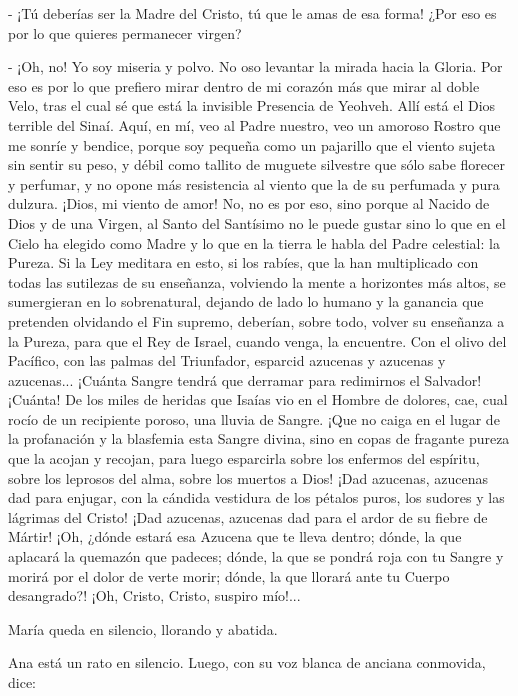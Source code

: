 \documentclass[12pt]{book} %
\begin{document}
- ¡Tú deberías ser la Madre del Cristo, tú que le amas de esa forma! ¿Por eso es por lo que quieres permanecer virgen? 

- ¡Oh, no! Yo soy miseria y polvo. No oso levantar la mirada hacia la Gloria. Por eso es por lo que prefiero mirar dentro de mi corazón más que mirar al doble Velo, tras el cual sé que está la invisible Presencia de Yeohveh. Allí está el Dios terrible del Sinaí. Aquí, en mí, veo al Padre nuestro, veo un amoroso Rostro que me sonríe y bendice, porque soy pequeña como un pajarillo que el viento sujeta sin sentir su peso, y débil como tallito de muguete silvestre que sólo sabe florecer y perfumar, y no opone más resistencia al viento que la de su perfumada y pura dulzura. ¡Dios, mi viento de amor! No, no es por eso, sino porque al Nacido de Dios y de una Virgen, al Santo del Santísimo no le puede gustar sino lo que en el Cielo ha elegido como Madre y lo que en la tierra le habla del Padre celestial: la Pureza. Si la Ley meditara en esto, si los rabíes, que la han multiplicado con todas las sutilezas de su enseñanza, volviendo la mente a horizontes más altos, se sumergieran en lo sobrenatural, dejando de lado lo humano y la ganancia que pretenden olvidando el Fin supremo, deberían, sobre todo, volver su enseñanza a la Pureza, para que el Rey de Israel, cuando venga, la encuentre. Con el olivo del Pacífico, con las palmas del Triunfador, esparcid azucenas y azucenas y azucenas... ¡Cuánta Sangre tendrá que derramar para redimirnos el Salvador! ¡Cuánta! De los miles de heridas que Isaías vio en el Hombre de dolores, cae, cual rocío de un recipiente poroso, una lluvia de Sangre. ¡Que no caiga en el lugar de la profanación y la blasfemia esta Sangre divina, sino en copas de fragante pureza que la acojan y recojan, para luego esparcirla sobre los enfermos del espíritu, sobre los leprosos del alma, sobre los muertos a Dios! ¡Dad azucenas, azucenas dad para enjugar, con la cándida vestidura de los pétalos puros, los sudores y las lágrimas del Cristo! ¡Dad azucenas, azucenas dad para el ardor de su fiebre de Mártir! ¡Oh, ¿dónde estará esa Azucena que te lleva dentro; dónde, la que aplacará la quemazón que padeces; dónde, la que se pondrá roja con tu Sangre y morirá por el dolor de verte morir; dónde, la que llorará ante tu Cuerpo desangrado?! ¡Oh, Cristo, Cristo, suspiro mío!... 

María queda en silencio, llorando y abatida. 

Ana está un rato en silencio. Luego, con su voz blanca de anciana conmovida, dice: 
\end{document}
